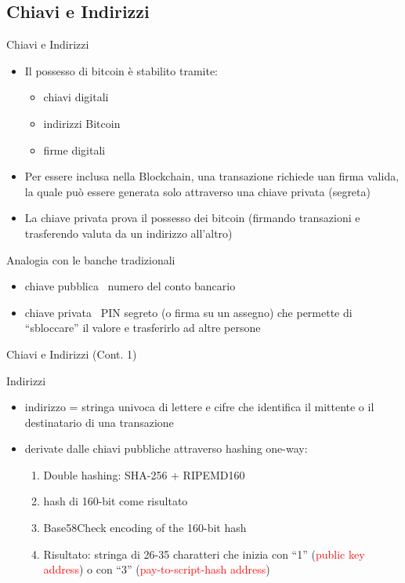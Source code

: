\documentclass{beamer}
\newcommand\red[1]{\textcolor{red}{#1}}
\begin{document}
  \subsection{Chiavi e Indirizzi}
  \begin{frame}{Chiavi e Indirizzi}
    \begin{itemize}
      \item Il possesso di bitcoin è stabilito tramite:
      \begin{itemize}
          \item chiavi digitali 
          \item indirizzi Bitcoin 
          \item firme digitali
      \end{itemize} 
      \item Per essere inclusa nella Blockchain, una transazione richiede uan firma valida, la quale può essere generata solo attraverso una chiave privata (segreta)  
      \item La chiave privata prova il possesso dei bitcoin (firmando transazioni e trasferendo valuta da un indirizzo all'altro) \pause
    \end{itemize}
    \begin{block}{Analogia con le banche tradizionali}
      \begin{itemize}
        \item chiave pubblica \MVRightarrow\, numero del conto bancario
        \item chiave privata \MVRightarrow\, PIN segreto (o firma su un assegno) che permette di ``sbloccare'' il valore e trasferirlo ad altre persone 
      \end{itemize}
    \end{block}
  \end{frame}





  \begin{frame}{Chiavi e Indirizzi (Cont. 1)}
    \begin{block}{Indirizzi}
      \begin{itemize}
        \item indirizzo = stringa univoca di lettere e cifre che identifica il mittente o il destinatario di una transazione  \pause
        \item derivate dalle chiavi pubbliche attraverso hashing one-way:
        \begin{enumerate}
          \item Double hashing: SHA-256 + RIPEMD160
          \item hash di 160-bit come risultato
          \item Base58Check encoding of the 160-bit hash
          \item Risultato: stringa di 26-35 charatteri che inizia con ``1'' (\red{public key address}) o con ``3'' (\red{pay-to-script-hash address})
        \end{enumerate}
      \end{itemize}
    \end{block}
  \end{frame}
\end{document}
